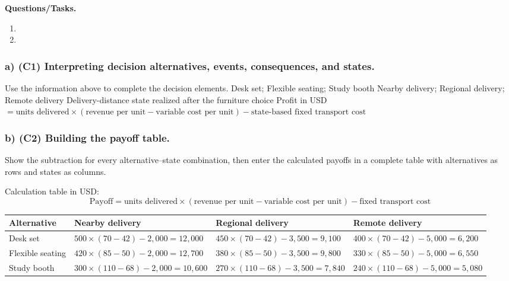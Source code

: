 \textbf{Questions/Tasks.}
\begin{enumerate}[label=\textbf{\alph*)}]
 \item {}
 \item {}
\end{enumerate}
\subsubsection*{a) \textbf{(C1)} Interpreting decision alternatives, events, consequences, and states.}
\label{subsec:problem16-school-furniture-bid-c1}
Use the information above to complete the decision elements.
\DecisionElementsTable
{Desk set; Flexible seating; Study booth}
{Nearby delivery; Regional delivery; Remote delivery}
{Delivery-distance state realized after the furniture choice}
{Profit in USD $= \text{units delivered} \times (\text{revenue per unit} - \text{variable cost per unit}) - \text{state-based fixed transport cost}$}
\subsubsection*{b) \textbf{(C2)} Building the payoff table.}
\label{subsec:problem16-school-furniture-bid-c2}
Show the subtraction for every alternative--state combination, then enter the calculated payoffs in a complete table with alternatives as rows and states as columns.

Calculation table in USD:
\[
\text{Payoff}=\text{units delivered}\times(\text{revenue per unit}-\text{variable cost per unit})-\text{fixed transport cost}
\]
\begin{center}
\small
\begin{tabular}{llll}
\toprule
Alternative & Nearby delivery & Regional delivery & Remote delivery \\
\midrule
Desk set & $500 \times (70 - 42) - 2{,}000 = 12{,}000$ & $450 \times (70 - 42) - 3{,}500 = 9{,}100$ & $400 \times (70 - 42) - 5{,}000 = 6{,}200$ \\
Flexible seating & $420 \times (85 - 50) - 2{,}000 = 12{,}700$ & $380 \times (85 - 50) - 3{,}500 = 9{,}800$ & $330 \times (85 - 50) - 5{,}000 = 6{,}550$ \\
Study booth & $300 \times (110 - 68) - 2{,}000 = 10{,}600$ & $270 \times (110 - 68) - 3{,}500 = 7{,}840$ & $240 \times (110 - 68) - 5{,}000 = 5{,}080$ \\
\bottomrule
\end{tabular}
\end{center}

